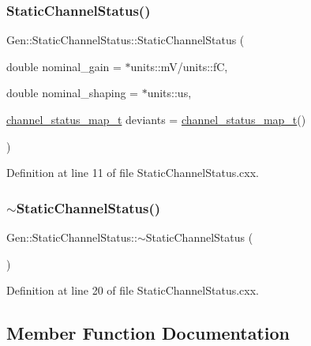 \subsubsection{\texorpdfstring{Static\+Channel\+Status()}{StaticChannelStatus()}}
{\footnotesize\ttfamily Gen\+::\+Static\+Channel\+Status\+::\+Static\+Channel\+Status (\begin{DoxyParamCaption}\item[{double}]{nominal\+\_\+gain = {$\ast$units\+:\+:mV/units\+:\+:fC},  }\item[{double}]{nominal\+\_\+shaping = {$\ast$units\+:\+:us},  }\item[{\hyperlink{class_wire_cell_1_1_gen_1_1_static_channel_status_af2f193308d13e8a6c5815d8021499803}{channel\+\_\+status\+\_\+map\+\_\+t}}]{deviants = {\ttfamily \hyperlink{class_wire_cell_1_1_gen_1_1_static_channel_status_af2f193308d13e8a6c5815d8021499803}{channel\+\_\+status\+\_\+map\+\_\+t}()} }\end{DoxyParamCaption})}



Definition at line 11 of file Static\+Channel\+Status.\+cxx.

\mbox{\label{class_wire_cell_1_1_gen_1_1_static_channel_status_a815f8be21bd561e2c3baf50eb7d056f9}} 
\subsubsection{\texorpdfstring{$\sim$\+Static\+Channel\+Status()}{~StaticChannelStatus()}}
{\footnotesize\ttfamily Gen\+::\+Static\+Channel\+Status\+::$\sim$\+Static\+Channel\+Status (\begin{DoxyParamCaption}{ }\end{DoxyParamCaption})\hspace{0.3cm}{\ttfamily [virtual]}}



Definition at line 20 of file Static\+Channel\+Status.\+cxx.



\subsection{Member Function Documentation}
\mbox{\label{class_wire_cell_1_1_gen_1_1_static_channel_status_a38b20d71c1ac913ae7fc278e2a20928b}} 
